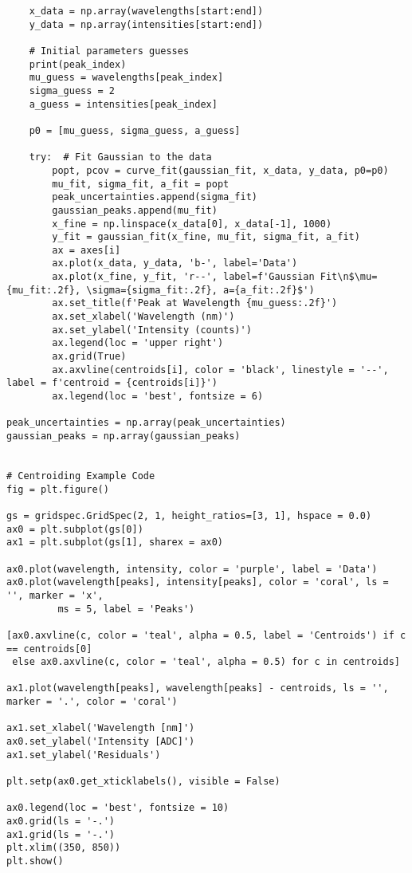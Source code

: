 \documentclass[10pt, preprint]{aastex}
\begin{document}
\begin{verbatim}
    x_data = np.array(wavelengths[start:end])
    y_data = np.array(intensities[start:end])
    
    # Initial parameters guesses
    print(peak_index)
    mu_guess = wavelengths[peak_index]
    sigma_guess = 2
    a_guess = intensities[peak_index]
    
    p0 = [mu_guess, sigma_guess, a_guess]
    
    try:  # Fit Gaussian to the data
        popt, pcov = curve_fit(gaussian_fit, x_data, y_data, p0=p0)
        mu_fit, sigma_fit, a_fit = popt
        peak_uncertainties.append(sigma_fit)
        gaussian_peaks.append(mu_fit)
        x_fine = np.linspace(x_data[0], x_data[-1], 1000)
        y_fit = gaussian_fit(x_fine, mu_fit, sigma_fit, a_fit)
        ax = axes[i]
        ax.plot(x_data, y_data, 'b-', label='Data')
        ax.plot(x_fine, y_fit, 'r--', label=f'Gaussian Fit\n$\mu={mu_fit:.2f}, \sigma={sigma_fit:.2f}, a={a_fit:.2f}$')
        ax.set_title(f'Peak at Wavelength {mu_guess:.2f}')
        ax.set_xlabel('Wavelength (nm)')
        ax.set_ylabel('Intensity (counts)')
        ax.legend(loc = 'upper right')
        ax.grid(True)
        ax.axvline(centroids[i], color = 'black', linestyle = '--', label = f'centroid = {centroids[i]}')
        ax.legend(loc = 'best', fontsize = 6)
    
peak_uncertainties = np.array(peak_uncertainties)
gaussian_peaks = np.array(gaussian_peaks)


# Centroiding Example Code
fig = plt.figure()

gs = gridspec.GridSpec(2, 1, height_ratios=[3, 1], hspace = 0.0)
ax0 = plt.subplot(gs[0])
ax1 = plt.subplot(gs[1], sharex = ax0)

ax0.plot(wavelength, intensity, color = 'purple', label = 'Data')
ax0.plot(wavelength[peaks], intensity[peaks], color = 'coral', ls = '', marker = 'x',
         ms = 5, label = 'Peaks')

[ax0.axvline(c, color = 'teal', alpha = 0.5, label = 'Centroids') if c == centroids[0]
 else ax0.axvline(c, color = 'teal', alpha = 0.5) for c in centroids]

ax1.plot(wavelength[peaks], wavelength[peaks] - centroids, ls = '', marker = '.', color = 'coral')

ax1.set_xlabel('Wavelength [nm]')
ax0.set_ylabel('Intensity [ADC]')
ax1.set_ylabel('Residuals')

plt.setp(ax0.get_xticklabels(), visible = False)

ax0.legend(loc = 'best', fontsize = 10)
ax0.grid(ls = '-.')
ax1.grid(ls = '-.')
plt.xlim((350, 850))
plt.show()


\end{verbatim}
\end{document}

